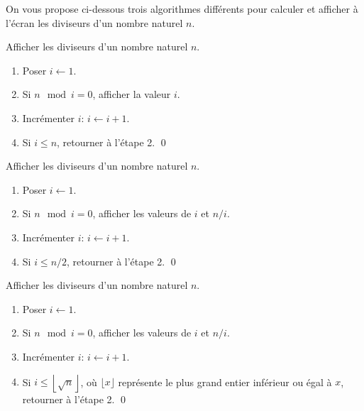 \begin{exercice}
  On vous propose ci-dessous trois algorithmes différents pour
  calculer et afficher à l'écran les diviseurs d'un nombre naturel
  $n$.

  \begingroup
  \setcounter{algorithme}{0}
  \renewcommand{\thealgorithme}{\Alph{algorithme}}
  \begin{algorithme}
    Afficher les diviseurs d'un nombre naturel $n$.
    \begin{enumerate}[1.]
    \item Poser $i \leftarrow 1$.
    \item Si $n \mod i = 0$, afficher la valeur $i$.
    \item Incrémenter $i$: $i \leftarrow i + 1$.
    \item Si $i \leq n$, retourner à l'étape 2.
      \qed
    \end{enumerate}
  \end{algorithme}

  \begin{algorithme}
    Afficher les diviseurs d'un nombre naturel $n$.
    \begin{enumerate}[1.]
    \item Poser $i \leftarrow 1$.
    \item Si $n \mod i = 0$, afficher les valeurs de $i$ et $n/i$.
    \item Incrémenter $i$: $i \leftarrow i + 1$.
    \item Si $i \leq n/2$, retourner à l'étape 2.
      \qed
    \end{enumerate}
  \end{algorithme}

  \begin{algorithme}
    Afficher les diviseurs d'un nombre naturel $n$.
    \begin{enumerate}[1.]
    \item Poser $i \leftarrow 1$.
    \item Si $n \mod i = 0$, afficher les valeurs de $i$ et $n/i$.
    \item Incrémenter $i$: $i \leftarrow i + 1$.
    \item Si $i \leq \left\lfloor \sqrt{n} \right\rfloor$, où
      $\lfloor x \rfloor$ représente le plus grand entier inférieur ou
      égal à $x$, retourner à l'étape 2.
      \qed
    \end{enumerate}
  \end{algorithme}
  \endgroup


\end{exercice}

